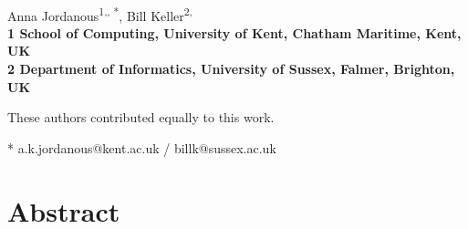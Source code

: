 \documentclass[10pt,letterpaper]{article}
\date{}
\begin{document}
\vspace*{0.35in}

\begin{flushleft}
{\Large
\textbf{}
}
\newline
\\
Anna Jordanous\textsuperscript{1,\Yinyang, *},
Bill Keller\textsuperscript{2,\Yinyang}
\\
\bigskip
\bf{1} School of Computing, University of Kent, Chatham Maritime, Kent, UK
\\
\bf{2} Department of Informatics, University of Sussex, Falmer, Brighton, UK
\\
\bigskip

% 
%
\Yinyang These authors contributed equally to this work.





* a.k.jordanous@kent.ac.uk / billk@sussex.ac.uk 

\end{flushleft}
\section*{Abstract}
\end{document}
